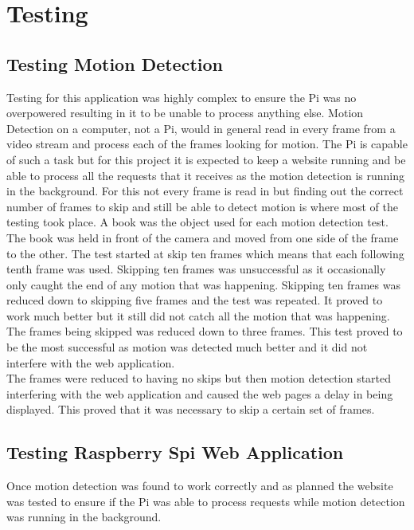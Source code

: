 \documentclass[12pt]{report}
\begin{document}
\chapter{Testing}
\label{ch:test}
%
%
\section{Testing Motion Detection}
\label{sec:motionTest}
%

Testing for this application was highly complex to ensure the Pi was no overpowered resulting in it to be unable to process anything else. Motion Detection on a computer, not a Pi, would in general read in every frame from a video stream and process each of the frames looking for motion. The Pi is capable of such a task but for this project it is expected to keep a website running and be able to process all the requests that it receives as the motion detection is running in the background. For this not every frame is read in but finding out the correct number of frames to skip and still be able to detect motion is where most of the testing took place. A book was the object used for each motion detection test. The book was held in front of the camera and moved from one side of the frame to the other. The test started at skip ten frames which means that each following tenth frame was used. Skipping ten frames was unsuccessful as it occasionally only caught the end of any motion that was happening. Skipping ten frames was reduced down to skipping five frames and the test was repeated. It proved to work much better but it still did not catch all the motion that was happening. The frames being skipped was reduced down to three frames. This test proved to be the most successful as motion was detected much better and it did not interfere with the web application.\\

The frames were reduced to having no skips but then motion detection started interfering with the web application and caused the web pages a delay in being displayed. This proved that it was necessary to skip a certain set of frames.\\

\section{Testing Raspberry Spi Web Application}
\label{sec:websiteTest}
%
Once motion detection was found to work correctly and as planned the website was tested to ensure if the Pi was able to process requests while motion detection was running in the background.\\
\end{document}
